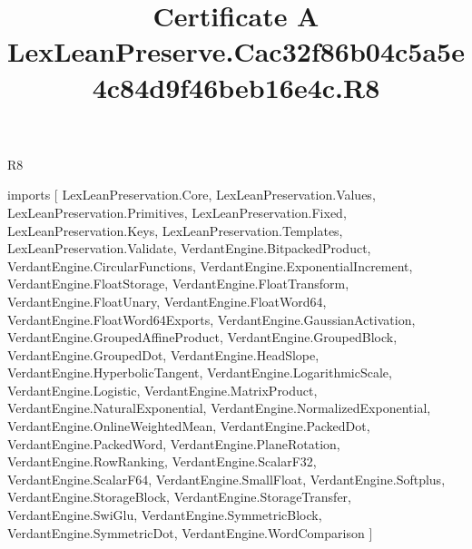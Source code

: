 \begin{lexlean}{R8}
\title{Certificate A LexLeanPreserve.Cac32f86b04c5a5e4c84d9f46beb16e4c.R8}
\begin{coremodule}
imports [
  LexLeanPreservation.Core,
  LexLeanPreservation.Values,
  LexLeanPreservation.Primitives,
  LexLeanPreservation.Fixed,
  LexLeanPreservation.Keys,
  LexLeanPreservation.Templates,
  LexLeanPreservation.Validate,
  VerdantEngine.BitpackedProduct,
  VerdantEngine.CircularFunctions,
  VerdantEngine.ExponentialIncrement,
  VerdantEngine.FloatStorage,
  VerdantEngine.FloatTransform,
  VerdantEngine.FloatUnary,
  VerdantEngine.FloatWord64,
  VerdantEngine.FloatWord64Exports,
  VerdantEngine.GaussianActivation,
  VerdantEngine.GroupedAffineProduct,
  VerdantEngine.GroupedBlock,
  VerdantEngine.GroupedDot,
  VerdantEngine.HeadSlope,
  VerdantEngine.HyperbolicTangent,
  VerdantEngine.LogarithmicScale,
  VerdantEngine.Logistic,
  VerdantEngine.MatrixProduct,
  VerdantEngine.NaturalExponential,
  VerdantEngine.NormalizedExponential,
  VerdantEngine.OnlineWeightedMean,
  VerdantEngine.PackedDot,
  VerdantEngine.PackedWord,
  VerdantEngine.PlaneRotation,
  VerdantEngine.RowRanking,
  VerdantEngine.ScalarF32,
  VerdantEngine.ScalarF64,
  VerdantEngine.SmallFloat,
  VerdantEngine.Softplus,
  VerdantEngine.StorageBlock,
  VerdantEngine.StorageTransfer,
  VerdantEngine.SwiGlu,
  VerdantEngine.SymmetricBlock,
  VerdantEngine.SymmetricDot,
  VerdantEngine.WordComparison
]


\end{coremodule}
\end{lexlean}
